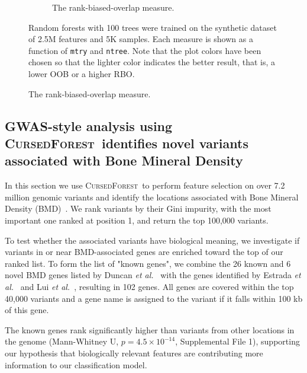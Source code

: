 \documentclass[10pt,letterpaper]{article}
\newcommand{\cursedforest}{\textsc{CursedForest}\xspace}
\newcommand{\mtry}{\texttt{mtry}\xspace}
\newcommand{\ntree}{\texttt{ntree}\xspace}
\begin{document}
\begin{figure}[tbhp]
\begin{adjustwidth}{-1.00in}{0in}
\begin{subfigure}[b]{0.5\linewidth}
      \caption{The rank-biased-overlap measure.} 
      \label{figure:rbo-prod.png} 
    \end{subfigure} 
    \begin{flushleft} 
      Random forests with 100 trees were trained on the synthetic dataset of 2.5M features and 5K samples.
      Each measure is shown as a function of \mtry and \ntree. Note that the plot colors have been chosen so that the lighter color indicates
      the better result, that is, a lower OOB or a higher RBO.
    \end{flushleft}
  \end{adjustwidth}
\end{figure}

\subsection{GWAS-style analysis using \cursedforest\ identifies novel variants associated with Bone Mineral Density}
In this section we use \cursedforest\ to perform feature selection on over 7.2 million genomic variants and identify the
locations associated with Bone Mineral Density (BMD)~\cite{Duncan.2011}. 
We rank variants by their Gini impurity, with the most important one ranked at position 1, and return the top 100,000 variants.

To test whether the associated variants have biological meaning, we investigate if variants in or near
BMD-associated genes are enriched toward the top of our ranked list. To form the list of "known genes", we
combine the 26 known and 6 novel BMD genes listed by Duncan {\it et al.}~\cite{Duncan.2011} with the genes identified by
Estrada {\it et al.}~\cite{Estrada2012} and Lui {\it et al.}~\cite{Liu2008}, resulting in 102 genes.  All genes are covered within the
top 40,000 variants and a gene name is assigned to the variant if it falls within 100 kb of this gene.

The known genes rank significantly higher than variants from other locations in the genome (Mann-Whitney U, $p=4.5\times10^{-14}$, Supplemental File 1), 
supporting our hypothesis that biologically relevant features are contributing more information to our classification model.
\end{document}
